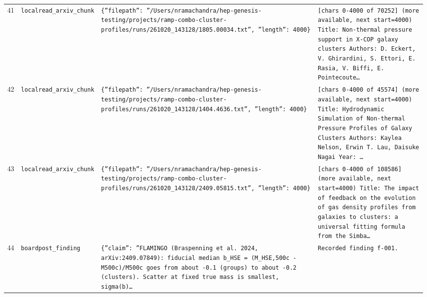 \documentclass[11pt,a4paper]{article}
\begin{document}
\begin{longtable}{@{}p{}p{}p{}p{}@{}}
41 & \texttt{local}\newline\texttt{read\_\allowbreak{}arxiv\_\allowbreak{}chunk} & \texttt{\{''filepath'':\allowbreak{} ''/\allowbreak{}Users/\allowbreak{}nramachandra/\allowbreak{}hep-genesis-testing/\allowbreak{}projects/\allowbreak{}ramp-combo-cluster-profiles/\allowbreak{}runs/\allowbreak{}261020\_\allowbreak{}143128/\allowbreak{}1805.00034.txt'',\allowbreak{} ''length'':\allowbreak{} 4000\}\allowbreak{}} & \texttt{[chars 0-4000 of 70252]\allowbreak{} (more available,\allowbreak{} next start=\allowbreak{}4000)\allowbreak{}  Title:\allowbreak{} Non-thermal pressure support in X-COP galaxy clusters Authors:\allowbreak{} D. Eckert,\allowbreak{} V. Ghirardini,\allowbreak{} S. Ettori,\allowbreak{} E. Rasia,\allowbreak{} V. Biffi,\allowbreak{} E. Pointecoute\ldots{}\allowbreak{}} \\
42 & \texttt{local}\newline\texttt{read\_\allowbreak{}arxiv\_\allowbreak{}chunk} & \texttt{\{''filepath'':\allowbreak{} ''/\allowbreak{}Users/\allowbreak{}nramachandra/\allowbreak{}hep-genesis-testing/\allowbreak{}projects/\allowbreak{}ramp-combo-cluster-profiles/\allowbreak{}runs/\allowbreak{}261020\_\allowbreak{}143128/\allowbreak{}1404.4636.txt'',\allowbreak{} ''length'':\allowbreak{} 4000\}\allowbreak{}} & \texttt{[chars 0-4000 of 45574]\allowbreak{} (more available,\allowbreak{} next start=\allowbreak{}4000)\allowbreak{}  Title:\allowbreak{} Hydrodynamic Simulation of Non-thermal Pressure Profiles of Galaxy Clusters Authors:\allowbreak{} Kaylea Nelson,\allowbreak{} Erwin T. Lau,\allowbreak{} Daisuke Nagai Year:\allowbreak{} \ldots{}\allowbreak{}} \\
43 & \texttt{local}\newline\texttt{read\_\allowbreak{}arxiv\_\allowbreak{}chunk} & \texttt{\{''filepath'':\allowbreak{} ''/\allowbreak{}Users/\allowbreak{}nramachandra/\allowbreak{}hep-genesis-testing/\allowbreak{}projects/\allowbreak{}ramp-combo-cluster-profiles/\allowbreak{}runs/\allowbreak{}261020\_\allowbreak{}143128/\allowbreak{}2409.05815.txt'',\allowbreak{} ''length'':\allowbreak{} 4000\}\allowbreak{}} & \texttt{[chars 0-4000 of 108586]\allowbreak{} (more available,\allowbreak{} next start=\allowbreak{}4000)\allowbreak{}  Title:\allowbreak{} The impact of feedback on the evolution of gas density profiles from galaxies to clusters:\allowbreak{} a universal fitting formula from the Simba\ldots{}\allowbreak{}} \\
44 & \texttt{board}\newline\texttt{post\_\allowbreak{}finding} & \texttt{\{''claim'':\allowbreak{} ''FLAMINGO (Braspenning et al. 2024,\allowbreak{} arXiv:\allowbreak{}2409.07849)\allowbreak{}:\allowbreak{} fiducial median b\_\allowbreak{}HSE =\allowbreak{} (M\_\allowbreak{}HSE,\allowbreak{}500c - M500c)\allowbreak{}/\allowbreak{}M500c goes from about -0.1 (groups)\allowbreak{} to about -0.2 (clusters)\allowbreak{}. Scatter at fixed true mass is smallest,\allowbreak{} sigma(b)\allowbreak{}\ldots{}\allowbreak{}} & \texttt{Recorded finding f-001.} \\

\end{longtable}
\end{document}
